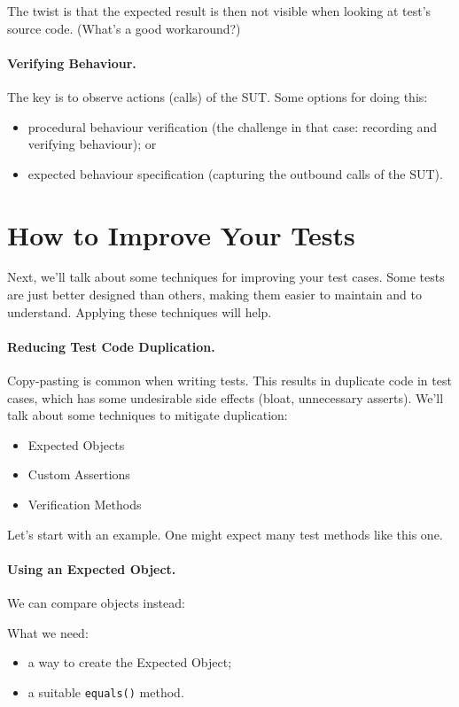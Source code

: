 \documentclass[11pt]{article}
\newenvironment{itemizep}{
 \begin{itemize}
  \setlength{\itemsep}{0pt}
  \setlength{\parsep}{3pt}
  \setlength{\topsep}{3pt}
  \setlength{\partopsep}{0pt}
  \setlength{\leftmargin}{1.5em}
  \setlength{\labelwidth}{1em}
  \setlength{\labelsep}{0.5em} }
 {\end{itemize}}
\begin{document}
The twist is that the expected result is then not visible when looking
at test's source code. (What's a good workaround?)

\paragraph{Verifying Behaviour.} The key is to observe actions
(calls) of the SUT. Some options for doing this:
\begin{itemizep}
\item procedural behaviour verification
  (the challenge in that case: recording and verifying behaviour); or
\item expected behaviour specification
  (capturing the outbound calls of the SUT).
\end{itemizep}

\section*{How to Improve Your Tests}
Next, we'll talk about some techniques for improving your test cases.
Some tests are just better designed than others, making them easier
to maintain and to understand. Applying these techniques will help.

\paragraph{Reducing Test Code Duplication.}
Copy-pasting is common when writing tests. This results in
duplicate code in test cases, which has some undesirable
side effects (bloat, unnecessary asserts). We'll talk about
some techniques to mitigate duplication:
\begin{itemizep}
\item Expected Objects
\item Custom Assertions
\item Verification Methods
\end{itemizep}

Let's start with an example. One might expect many test methods like
this one.

\paragraph{Using an Expected Object.} We can compare objects instead:

What we need:
\begin{itemizep}
\item a way to create the Expected Object;
\item a suitable {\tt equals()} method.
\end{itemizep}
\end{document}
